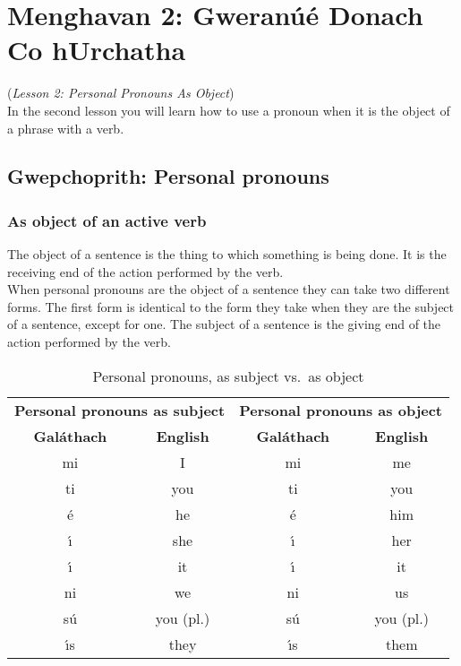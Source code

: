 \section{Menghavan 2: Gweran\'{u}\'{e} Donach Co hUrchatha}
(\textit{Lesson 2: Personal Pronouns As Object})\\

In the second lesson you will learn how to use a pronoun when it is the object of a phrase with a verb.

\subsection{Gwepchoprith: Personal pronouns}
\subsubsection{As object of an active verb}

The object of a sentence is the thing to which something is being done. It is the receiving end of the action performed by the verb.\\

When personal pronouns are the object of a sentence they can take two different forms. The first form is identical to the form they take when they are the subject of a sentence, except for one. The subject of a sentence is the giving end of the action performed by the verb.

\begin{table}[H]
\centering
\begin{tabular}{cccc}
  \toprule
  \multicolumn{2}{c}{\textbf{Personal pronouns as subject}} & \multicolumn{2}{c}{\textbf{Personal pronouns as object}}\\
  \cmidrule(lr){1-2}\cmidrule(lr){3-4}
  \textbf{Gal\'{a}thach} & \textbf{English} & \textbf{Gal\'{a}thach} & \textbf{English}\\
  \cmidrule(lr){1-1}\cmidrule(lr){2-2}\cmidrule(lr){3-3}\cmidrule(lr){4-4}
  mi & I & mi & me\\
  ti & you & ti & you\\
  \'{e} & he & \'{e} & him\\
  \'{\i} & she & \'{\i} & her\\
  \'{\i} & it & \'{\i} & it\\
  ni & we & ni & us\\
  s\'{u} & you (pl.) & s\'{u} & you (pl.)\\
  \'{\i}s & they & \'{\i}s & them\\
  \bottomrule
\end{tabular}
\caption{Personal pronouns, as subject vs.\ as object}
\label{personal_pronouns_subject_object}
\end{table}

